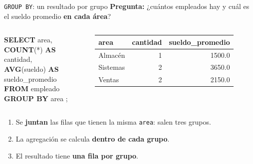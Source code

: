 \documentclass[aspectratio=169,10pt,c]{beamer}
\newcommand{\kw}[1]{\textcolor{utpRojo}{\textbf{#1}}}
\newcommand{\nuevo}[1]{{%
  \setlength{\fboxsep}{1.2pt}%
  \begingroup
  \renewcommand{\kw}[1]{\textcolor{utpNegro}{\textbf{##1}}}%
  \colorbox{yellow!45}{\textcolor{utpNegro}{#1}}%
  \endgroup}}
\newenvironment{sqlcode}[1][.86\textwidth]
  {\begin{center}\begin{lrbox}{\sqlbuf}\begin{minipage}{#1}\ttfamily\footnotesize\vspace{6pt}\raggedright}
  {\vspace{6pt}\end{minipage}\end{lrbox}\colorbox{utpGrisClaro}{\usebox{\sqlbuf}}\end{center}}
\newcommand{\ind}{\hspace*{1.6em}}
\newcommand{\cab}[1]{\normalfont\bfseries #1}
\newcommand{\res}[3]{%
  \centering{\scriptsize\color{utpGris}resultado}\\[3pt]
  \footnotesize\ttfamily
  \begin{tabular}{#1}
  \toprule
  #2 \\
  \midrule
  #3
  \bottomrule
  \end{tabular}}
\begin{document}
\begin{frame}{\texttt{GROUP BY}: un resultado por grupo}
\small \textbf{Pregunta:} ¿cuántos empleados hay y cuál es el sueldo promedio \textbf{en cada área}?
\vspace{0.05cm}
\begin{columns}[c,onlytextwidth]
\begin{sqlcode}[\textwidth]
\scriptsize
\kw{SELECT} area,\\
\ind \kw{COUNT}(*) \kw{AS} cantidad,\\
\ind \kw{AVG}(sueldo) \kw{AS} sueldo\_promedio\\
\kw{FROM} empleado\\
\nuevo{\kw{GROUP BY} area};
\end{sqlcode}
\res{lrr}{\cab{area} & \cab{cantidad} & \cab{sueldo\_promedio}}{%
  Almacén & 1 & 1500.0 \\
  Sistemas & 2 & 3650.0 \\
  Ventas & 2 & 2150.0 \\}
\end{columns}
\vspace{0.2cm}
\begin{enumerate}\setlength\itemsep{5pt}
  \item Se \textbf{juntan} las filas que tienen la misma \texttt{area}: salen tres grupos.
  \item La agregación se calcula \textbf{dentro de cada grupo}.
  \item El resultado tiene \textbf{una fila por grupo}.
\end{enumerate}
\vspace{0.1cm}
\end{frame}
\end{document}
